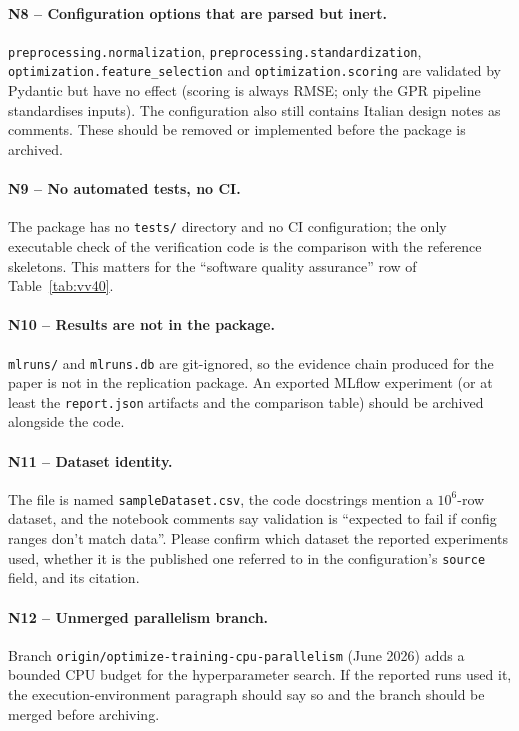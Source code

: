 \paragraph{N8 -- Configuration options that are parsed but inert.}
\texttt{preprocessing.normalization}, \texttt{preprocessing.standardization},
\texttt{optimization.feature\_selection} and \texttt{optimization.scoring}
are validated by Pydantic but have no effect (scoring is always RMSE; only
the GPR pipeline standardises inputs). The configuration also still contains
Italian design notes as comments. These should be removed or implemented
before the package is archived.

\paragraph{N9 -- No automated tests, no CI.}
The package has no \texttt{tests/} directory and no CI configuration; the
only executable check of the verification code is the comparison with the
reference skeletons. This matters for the ``software quality assurance''
row of Table~\ref{tab:vv40}.

\paragraph{N10 -- Results are not in the package.}
\texttt{mlruns/} and \texttt{mlruns.db} are git-ignored, so the evidence
chain produced for the paper is not in the replication package. An exported
MLflow experiment (or at least the \texttt{report.json} artifacts and the
comparison table) should be archived alongside the code.

\paragraph{N11 -- Dataset identity.}
The file is named \texttt{sampleDataset.csv}, the code docstrings mention a
$10^6$-row dataset, and the notebook comments say validation is ``expected to
fail if config ranges don't match data''. Please confirm which dataset the
reported experiments used, whether it is the published one referred to in
the configuration's \texttt{source} field, and its citation.

\paragraph{N12 -- Unmerged parallelism branch.}
Branch \texttt{origin/optimize-training-cpu-parallelism} (June 2026) adds a
bounded CPU budget for the hyperparameter search. If the reported runs used
it, the execution-environment paragraph should say so and the branch should
be merged before archiving.

